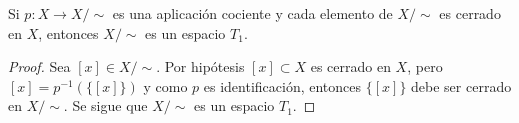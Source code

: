 

\begin{theorem}
Si $p : X \longrightarrow X/\sim$ es una aplicación cociente y cada elemento de $X/\sim$ es cerrado en $X$, entonces $X/\sim$ es un espacio $T_1$.
\end{theorem}

\begin{proof}
Sea $[x] \in X/\sim$. Por hipótesis $[x] \subset X$ es cerrado en $X$, pero $[x] = p^{-1}(\{ [x] \})$ y como $p$ es identificación, entonces $\{ [x] \}$ debe ser cerrado en $X/\sim$. Se sigue que $X/\sim$ es un espacio $T_1$.
\end{proof}
